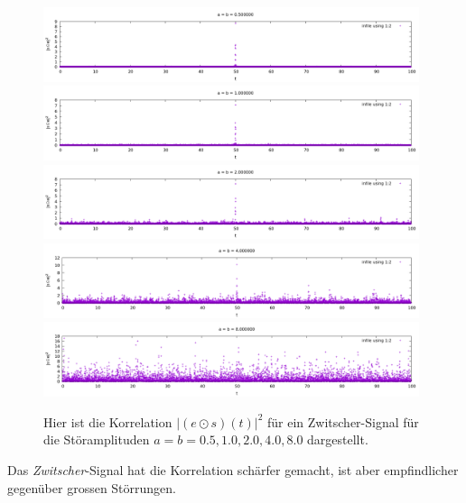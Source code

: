 \documentclass[ngerman]{scrartcl}
\begin{document}
\begin{figure}[htbp]
 	\centering
 	\includegraphics[width=0.98\textwidth]{plots/zwitscher/0.5}
 	\includegraphics[width=0.98\textwidth]{plots/zwitscher/1.0}
 	\includegraphics[width=0.98\textwidth]{plots/zwitscher/2.0}
 	\includegraphics[width=0.98\textwidth]{plots/zwitscher/4.0}
 	\includegraphics[width=0.98\textwidth]{plots/zwitscher/8.0}
	\caption[$|(e \odot s)(t)|^2$]{Hier ist die Korrelation $|(e \odot s)(t)|^2$ für ein Zwitscher-Signal für die Störamplituden $a=b=0.5, 1.0, 2.0, 4.0, 8.0$ dargestellt.}
	\label{fig:5.1}
\end{figure} 
Das \emph{Zwitscher}-Signal hat die Korrelation sch\"arfer gemacht,
ist aber empfindlicher gegen\"uber grossen St\"orrungen.
\end{document}
